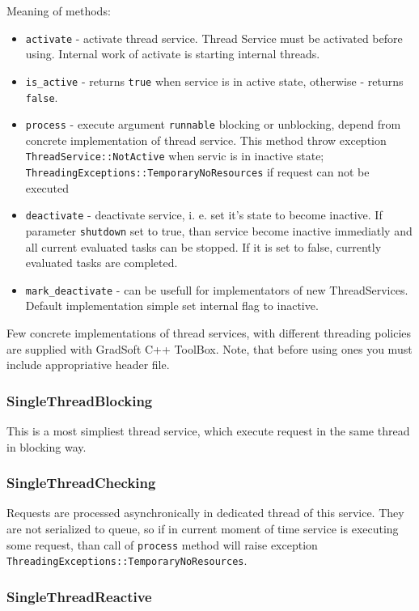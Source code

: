 \documentclass[10pt]{article}
\begin{document}
  Meaning of methods:
 \begin{itemize}
   \item \verb|activate| - activate thread service. Thread Service must be activated before using. Internal work of activate is starting internal threads.
   \item \verb|is_active| - returns \verb|true| when service is in active state, otherwise - returns \verb|false|. 
   \item \verb|process| - execute argument \verb|runnable| blocking or unblocking, depend from concrete implementation of thread service. This method throw
exception \verb|ThreadService::NotActive| when servic is in inactive state; 
\verb|ThreadingExceptions::TemporaryNoResources| if request can not be executed
   \item \verb|deactivate| - deactivate service, i. e. set it's state to 
 become inactive. If parameter \verb|shutdown| set to true, than service
 become inactive immediatly and all current evaluated tasks can be stopped.
 If it is set to false, currently evaluated tasks are completed.
   \item \verb|mark_deactivate| -  can be usefull for implementators of
 new ThreadServices. Default implementation simple set internal flag to
 inactive.
 \end{itemize}

 Few concrete implementations of thread services, with different threading policies are supplied with GradSoft C++ ToolBox. Note, that before using ones you must include appropriative header file.

\subsubsection{ SingleThreadBlocking }

  This is a most simpliest thread service, which execute request in the
same thread in blocking way.

\subsubsection{ SingleThreadChecking }

  Requests are processed asynchronically in dedicated thread of this service.
They are not serialized to queue, so if in current moment of time service is
executing some request, than call of \verb|process| method will raise exception
\verb|ThreadingExceptions::TemporaryNoResources|.

\subsubsection{ SingleThreadReactive }
\end{document}

